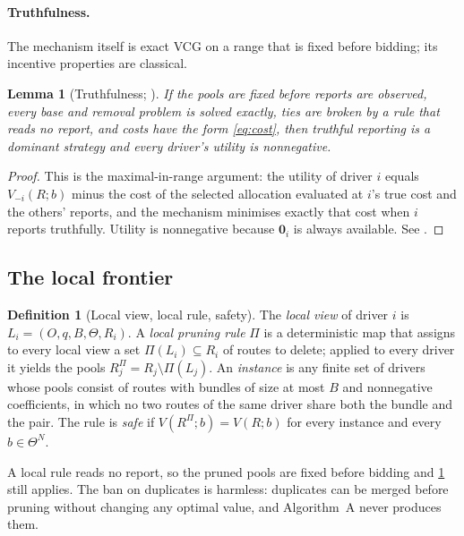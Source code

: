 \documentclass[11pt]{article}
\newtheorem{plemma}{Lemma}
\theoremstyle{definition}
\newtheorem{definition}{Definition}
\theoremstyle{remark}
\newcommand{\idle}{\mathbf{0}}
\begin{document}
\paragraph{Truthfulness.}
The mechanism itself is exact VCG on a range that is fixed before bidding; its
incentive properties are classical.

\begin{plemma}[Truthfulness; \citealp{nisan2007computationally}]\label{lem:dsic}
If the pools are fixed before reports are observed, every base and removal
problem is solved exactly, ties are broken by a rule that reads no report, and
costs have the form \eqref{eq:cost}, then truthful reporting is a dominant
strategy and every driver's utility is nonnegative.
\end{plemma}

\begin{proof}
This is the maximal-in-range argument: the utility of driver $i$ equals
$V_{-i}(R;b)$ minus the cost of the selected allocation evaluated at $i$'s true
cost and the others' reports, and the mechanism minimises exactly that cost
when $i$ reports truthfully. Utility is nonnegative because $\idle_i$ is always
available. See \citet{nisan2007computationally}.
\end{proof}

\subsection{The local frontier}
\label{sec:frontier}

\begin{definition}[Local view, local rule, safety]\label{def:local}
The \emph{local view} of driver $i$ is $L_i=(O,q,B,\Theta,R_i)$. A
\emph{local pruning rule} $\Pi$ is a deterministic map that assigns to every
local view a set $\Pi(L_i)\subseteq R_i$ of routes to delete; applied to every
driver it yields the pools $R^\Pi_j=R_j\setminus\Pi(L_j)$. An \emph{instance}
is any finite set of drivers whose pools consist of routes with bundles of size
at most $B$ and nonnegative coefficients, in which no two routes of the same
driver share both the bundle and the pair. The rule is \emph{safe} if
$V(R^\Pi;b)=V(R;b)$ for every instance and every $b\in\Theta^N$.
\end{definition}

A local rule reads no report, so the pruned pools are fixed before bidding and
\cref{lem:dsic} still applies. The ban on duplicates is harmless: duplicates can
be merged before pruning without changing any optimal value, and Algorithm~A
never produces them.
\end{document}
